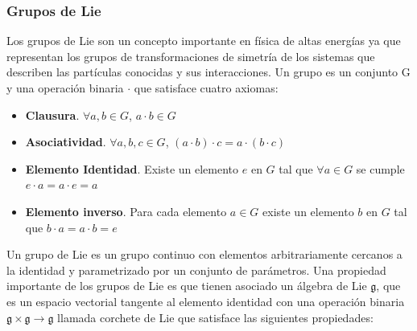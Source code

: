\documentclass{article}
\theoremstyle{plain}
\theoremstyle{definition}
\begin{document}
	\subsubsection{Grupos de Lie}
	Los grupos de Lie son un concepto importante en física de altas energías ya que representan los grupos de transformaciones de simetría de los sistemas que describen las partículas conocidas y sus interacciones.\newline
	Un grupo es un conjunto G y una operación binaria \(\cdot \) que satisface cuatro axiomas: 
	\begin{itemize}
		\item \textbf{Clausura}. \(\forall a,b \in G\), \(a\cdot b \in G \)
		\item \textbf{Asociatividad}. \(\forall a,b,c \in G\), \((a\cdot b) \cdot c = a \cdot (b\cdot c)  \)
		\item \textbf{Elemento Identidad}.  Existe un elemento \(e\) en \(G\) tal que \(\forall a \in G \) se cumple  \(e\cdot a = a \cdot e = a \)
		\item \textbf{Elemento inverso}. Para cada elemento \(a \in G \) existe un elemento \(b\) en \(G\) tal que \(b\cdot a = a \cdot b = e \)
	\end{itemize}
	Un grupo de Lie es un grupo continuo con elementos arbitrariamente cercanos a la identidad y  parametrizado por un conjunto de parámetros. Una propiedad importante de los grupos de Lie es que tienen asociado un álgebra de Lie \(\displaystyle {\mathfrak {g}} \), que es un espacio vectorial tangente al  elemento identidad con una operación binaria \(\displaystyle {\mathfrak {g}} \times \displaystyle {\mathfrak {g}} \rightarrow \displaystyle {\mathfrak {g}} \) llamada corchete de Lie que satisface las siguientes propiedades:
	
\end{document}
